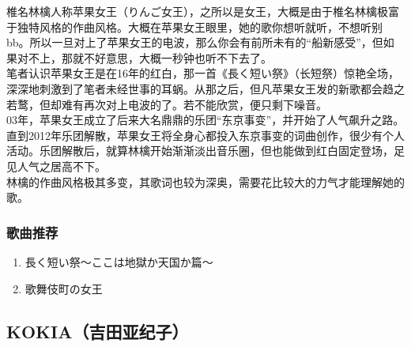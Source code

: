 \documentclass{ctexart}
\begin{document}
椎名林檎人称苹果女王（りんご女王），之所以是女王，大概是由于椎名林檎极富于独特风格的作曲风格。大概在苹果女王眼里，她的歌你想听就听，不想听别bb。所以一旦对上了苹果女王的电波，那么你会有前所未有的“船新感受”，但如果对不上，那就不好意思，大概一秒钟也听不下去了。\\
笔者认识苹果女王是在16年的红白，那一首《長く短い祭》（长短祭）惊艳全场，深深地刺激到了笔者未经世事的耳蜗。从那之后，但凡苹果女王发的新歌都会趋之若鹜，但却难有再次对上电波的了。若不能欣赏，便只剩下噪音。\\
03年，苹果女王成立了后来大名鼎鼎的乐团“东京事变”，并开始了人气飙升之路。直到2012年乐团解散，苹果女王将全身心都投入东京事变的词曲创作，很少有个人活动。乐团解散后，就算林檎开始渐渐淡出音乐圈，但也能做到红白固定登场，足见人气之居高不下。\\
林檎的作曲风格极其多变，其歌词也较为深奥，需要花比较大的力气才能理解她的歌。\\

\subsubsection*{歌曲推荐}
\begin{enumerate}
\item 長く短い祭～ここは地獄か天国か篇～
\item 歌舞伎町の女王
\end{enumerate}


\subsection{KOKIA（吉田亚纪子）}
\end{document}
